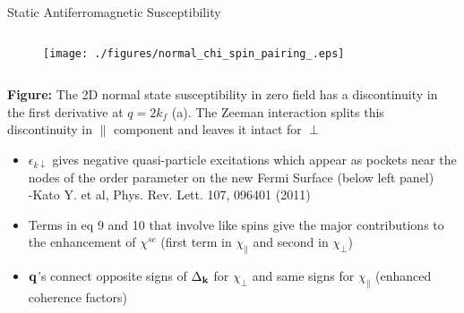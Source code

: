 \documentclass{beamer} %
\begin{document}
\begin{frame}{}
\begin{columns}[t]
\begin{column}{.59\textwidth}
\begin{block}{\centering\veryHuge Static Antiferromagnetic Susceptibility}
\begin{framed}
\begin{columns}[t]
\begin{column}{0.35\textwidth}
				\begin{figure}
				 \texttt{[image: ./figures/normal\_chi\_spin\_pairing\_.eps]}
				 \end{figure}
			\end{column}
			\end{columns}
			{\bf Figure:} The 2D normal state susceptibility in zero field has a discontinuity in the first derivative at $q=2k_f$ (a). The Zeeman interaction splits this discontinuity in $\parallel$ component and leaves it intact for $\perp$
			\end{framed}


					\begin{itemize}
					\item{$\epsilon_{k\downarrow}$ gives negative quasi-particle excitations which appear as pockets near the nodes of the order 
					parameter on the new Fermi Surface (below left panel) \\
					{\small -Kato Y. et al, Phys. Rev. Lett. 107, 096401 (2011)}}
					\item{Terms in eq 9 and 10 that involve like spins give the major contributions to the enhancement of $\chi^{sc}$ (first term in $\chi_{\parallel}$ and second in $\chi_{\perp}$)}
					\item{ ${\bf q}$'s connect opposite signs of $\Delta_{\bf k}$ for $\chi_{\perp}$ and same signs for $\chi_{\parallel}$ (enhanced coherence factors)}
					\end{itemize}


\end{block}
\end{column}
\end{columns}
\end{frame}
\end{document}
